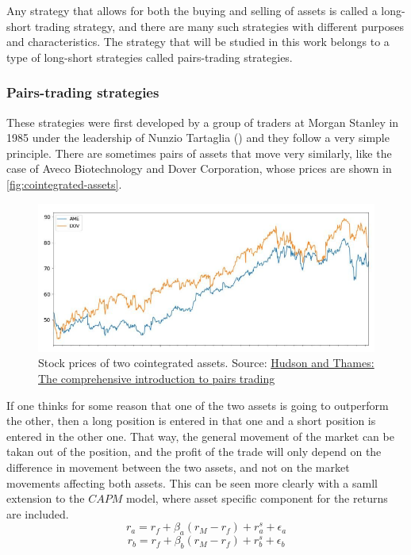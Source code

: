 Any strategy that allows for both the buying and selling of assets is called a long-short trading strategy, and there are many such strategies with different purposes and characteristics. The strategy that will be studied in this work belongs to a type of long-short strategies called pairs-trading strategies.

\subsubsection{Pairs-trading strategies}
These strategies were first developed by a group of traders at Morgan Stanley in 1985 under the leadership of Nunzio Tartaglia (\cite{pole_2011}) and they follow a very simple principle. There are sometimes pairs of assets that move very similarly, like the case of Aveco Biotechnology and Dover Corporation, whose prices are shown in \autoref{fig:cointegrated-assets}.

\begin{figure}[h]
    \captionsetup{justification=centering}
    \includegraphics[width=\linewidth]{assets/cointegrated-assets.png}
    \caption{Stock prices of two cointegrated assets. Source: \href{https://hudsonthames.org/definitive-guide-to-pairs-trading/}{Hudson and Thames: The comprehensive introduction to pairs trading}}
    \label{fig:cointegrated-assets}
\end{figure}

If one thinks for some reason that one of the two assets is going to outperform the other, then a long position is entered in that one and a short position is entered in the other one. That way, the general movement of the market can be takan out of the position, and the profit of the trade will only depend on the difference in movement between the two assets, and not on the market movements affecting both assets. 
This can be seen more clearly with a samll extension to the $CAPM$ model, where asset specific component for the returns are included.
\begin{equation}
    r_a=r_f+\beta_a(r_M-r_f)+ r_a^s+ \epsilon_a
\end{equation}
\begin{equation}
    r_b=r_f+\beta_b(r_M-r_f)+ r_b^s+ \epsilon_b
\end{equation}

